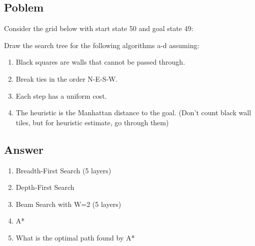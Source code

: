 \documentclass[11pt]{article}
\begin{document}
\begin{flushleft}
\subsection*{Poblem}
Consider the grid below with start state 50 and goal state 49:

Draw the search tree for the following algorithms a-d assuming: 
\begin{enumerate}
    \item Black squares are walls that cannot be passed through. 
    \item Break ties in the order N-E-S-W.
    \item Each step has a uniform cost.
    \item The heuristic is the Manhattan distance to the goal. (Don’t count
        black wall tiles, but for heuristic estimate, go through them)
\end{enumerate}

\subsection*{Answer}
\begin{enumerate}
    \item Breadth-First Search (5 layers)
    \item Depth-First Search
    \item Beam Search with W=2 (5 layers)
    \item A*
    \item What is the optimal path found by A*
\end{enumerate}

\end{flushleft}
\end{document}
